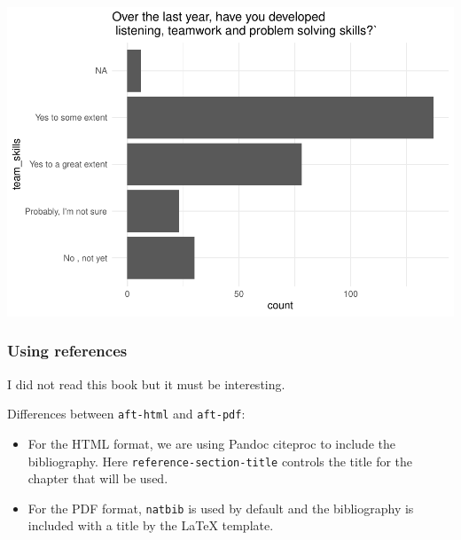 \documentclass[
]{aft}
\providecommand{\tightlist}{%
  \setlength{\itemsep}{0pt}\setlength{\parskip}{0pt}}\usepackage{longtable,booktabs,array}
\begin{document}
\includegraphics{journal_article_files/figure-pdf/unnamed-chunk-16-3.pdf}

\hypertarget{using-references}{%
\subsubsection*{Using references}\label{using-references}}

I did not read this book \citep{CameronTrivedi2013} but it must be
interesting.

Differences between \texttt{aft-html} and \texttt{aft-pdf}:

\begin{itemize}
\tightlist
\item
  For the HTML format, we are using Pandoc citeproc to include the
  bibliography. Here \texttt{reference-section-title} controls the title
  for the chapter that will be used.
\item
  For the PDF format, \texttt{natbib} is used by default and the
  bibliography is included with a title by the LaTeX template.
\end{itemize}


  
\end{document}
